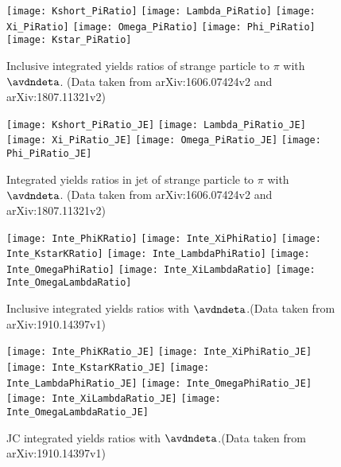 \begin{figure}[ht]
	\begin{center}
		\texttt{[image: Kshort\_PiRatio]}
		\texttt{[image: Lambda\_PiRatio]}
		\texttt{[image: Xi\_PiRatio]}
		\texttt{[image: Omega\_PiRatio]}
		\texttt{[image: Phi\_PiRatio]}	\texttt{[image: Kstar\_PiRatio]}
	\end{center}
	\caption{Inclusive integrated yields ratios of strange particle to $\pi$ with $\avdndeta$. (Data taken from arXiv:1606.07424v2 and arXiv:1807.11321v2)}
	\label{fig:InclIntePartoPiRatio}
\end{figure}


\begin{figure}[ht]
	\begin{center}
		\texttt{[image: Kshort\_PiRatio\_JE]}
		\texttt{[image: Lambda\_PiRatio\_JE]}
		\texttt{[image: Xi\_PiRatio\_JE]}
		\texttt{[image: Omega\_PiRatio\_JE]}
		\texttt{[image: Phi\_PiRatio\_JE]}
	\end{center}
	\caption{Integrated yields ratios in jet of strange particle to $\pi$ with $\avdndeta$. (Data taken from arXiv:1606.07424v2 and arXiv:1807.11321v2)}
	\label{fig:JEIntePartoPiRatio}
\end{figure}

\begin{figure}[ht]
	\begin{center}
		\texttt{[image: Inte\_PhiKRatio]}		\texttt{[image: Inte\_XiPhiRatio]}
		\texttt{[image: Inte\_KstarKRatio]}
		\texttt{[image: Inte\_LambdaPhiRatio]}
		\texttt{[image: Inte\_OmegaPhiRatio]}
		\texttt{[image: Inte\_XiLambdaRatio]}
		\texttt{[image: Inte\_OmegaLambdaRatio]}
	\end{center}
	\caption{Inclusive integrated yields ratios with $\avdndeta$.(Data taken from arXiv:1910.14397v1)}
	\label{fig:InclInteParRatio}
\end{figure}

\begin{figure}[ht]
	\begin{center}	
		\texttt{[image: Inte\_PhiKRatio\_JE]}		
		\texttt{[image: Inte\_XiPhiRatio\_JE]}
		\texttt{[image: Inte\_KstarKRatio\_JE]}
		\texttt{[image: Inte\_LambdaPhiRatio\_JE]}
		\texttt{[image: Inte\_OmegaPhiRatio\_JE]}
		\texttt{[image: Inte\_XiLambdaRatio\_JE]}
		\texttt{[image: Inte\_OmegaLambdaRatio\_JE]}
	\end{center}
	\caption{JC integrated yields ratios with $\avdndeta$.(Data taken from arXiv:1910.14397v1)}
	\label{fig:JCInteParRatio}
\end{figure}

